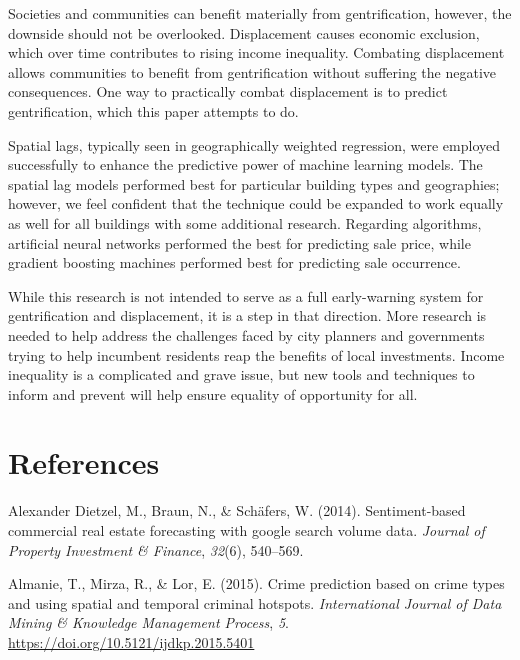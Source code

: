 \documentclass[conference,final,]{IEEEtran}
\begin{document}
Societies and communities can benefit materially from gentrification,
however, the downside should not be overlooked. Displacement causes
economic exclusion, which over time contributes to rising income
inequality. Combating displacement allows communities to benefit from
gentrification without suffering the negative consequences. One way to
practically combat displacement is to predict gentrification, which this
paper attempts to do.

Spatial lags, typically seen in geographically weighted regression, were
employed successfully to enhance the predictive power of machine
learning models. The spatial lag models performed best for particular
building types and geographies; however, we feel confident that the
technique could be expanded to work equally as well for all buildings
with some additional research. Regarding algorithms, artificial neural
networks performed the best for predicting sale price, while gradient
boosting machines performed best for predicting sale occurrence.

While this research is not intended to serve as a full early-warning
system for gentrification and displacement, it is a step in that
direction. More research is needed to help address the challenges faced
by city planners and governments trying to help incumbent residents reap
the benefits of local investments. Income inequality is a complicated
and grave issue, but new tools and techniques to inform and prevent will
help ensure equality of opportunity for all.

\newpage

\hypertarget{references}{%
\section*{References}\label{references}}

\hypertarget{refs}{}
\leavevmode\hypertarget{ref-Dietzell2014}{}%
Alexander Dietzel, M., Braun, N., \& Schäfers, W. (2014).
Sentiment-based commercial real estate forecasting with google search
volume data. \emph{Journal of Property Investment \& Finance},
\emph{32}(6), 540--569.

\leavevmode\hypertarget{ref-Almanie2015}{}%
Almanie, T., Mirza, R., \& Lor, E. (2015). Crime prediction based on
crime types and using spatial and temporal criminal hotspots.
\emph{International Journal of Data Mining \& Knowledge Management
Process}, \emph{5}. \url{https://doi.org/10.5121/ijdkp.2015.5401}
\end{document}
